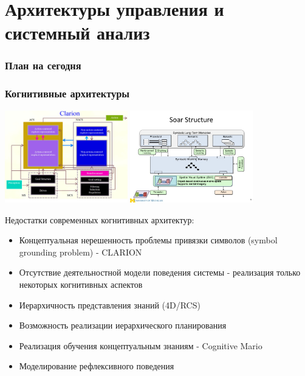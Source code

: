 \documentclass[12pt]{beamer}
\begin{document}
\section{Архитектуры управления и системный анализ}

\begin{frame}
\frametitle{План на сегодня}
\tableofcontents[currentsection] 
\end{frame}

\begin{frame}
\frametitle{Когнитивные архитектуры}
\begin{center}
	\includegraphics[width=0.4\textwidth]{agent-schemas/en/clarion.jpg}
	\includegraphics[width=0.4\textwidth]{agent-schemas/en/soar.jpg}
\end{center}
\scriptsize
Недостатки современных когнитивных архитектур:
\begin{itemize}
	\item Концептуальная нерешенность проблемы привязки символов (symbol grounding problem) - CLARION
	\item Отсутствие деятельностной модели поведения системы - реализация только некоторых когнитивных аспектов
	\item Иерархичность представления знаний (4D/RCS)
	\item Возможность реализации иерархического планирования
	\item Реализация обучения концептуальным знаниям - Cognitive Mario
	\item Моделирование рефлексивного поведения
\end{itemize}
\end{frame}
\end{document}
